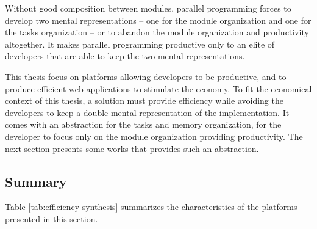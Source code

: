 Without good composition between modules, parallel programming forces to develop two mental representations -- one for the module organization and one for the tasks organization -- or to abandon the module organization and productivity altogether.
It makes parallel programming productive only to an elite of developers that are able to keep the two mental representations.

This thesis focus on platforms allowing developers to be productive, and to produce efficient web applications to stimulate the economy.
To fit the economical context of this thesis, a solution must provide efficiency while avoiding the developers to keep a double mental representation of the implementation.
It comes with an abstraction for the tasks and memory organization, for the developer to focus only on the module organization providing productivity.
The next section presents some works that provides such an abstraction.



\subsection{Summary} \label{chapter3:software-efficiency:summary}

Table \ref{tab:efficiency-synthesis} summarizes the characteristics of the platforms presented in this section.


\endinput







TO READ :

Streaming
\cite{Madsen2015}
\cite{Sun2015}

Map Reduce
\cite{Yao2015}


Web assembly
https://medium.com/javascript-scene/what-is-webassembly-the-dawn-of-a-new-era-61256ec5a8f6












